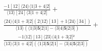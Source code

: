 \documentclass[varwidth, border=5pt]{standalone}
\begin{document}
\begin{my}
$\begin{gathered}
\scriptscriptstyle\frac{-1[12]⟨24⟩⟨1|3+4|2]}{⟨13⟩[24]⟨3|1+4|2]} +\\
\scriptscriptstyle\frac{⟨24⟩⟨4|1+3|2](2⟨12⟩[13]+1⟨24⟩[34])}{⟨13⟩(⟨1|3|𝟓|2|1]-⟨3|4|𝟓|2|3])} +\\
\scriptscriptstyle\frac{-1⟨12⟩[13]⟨23⟩⟨4|1+3|2]²}{⟨13⟩⟨3|1+4|2](⟨1|3|𝟓|2|1]-⟨3|4|𝟓|2|3])} \phantom{+}
\end{gathered}$
\end{my}
\end{document}
